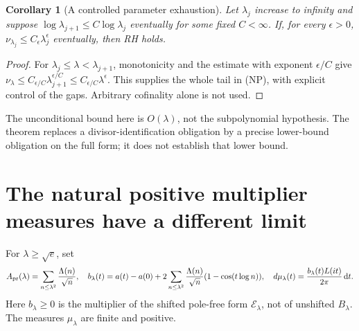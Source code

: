 \documentclass[11pt]{article}
\newtheorem{corollary}[theorem]{Corollary}
\theoremstyle{remark}\newtheorem{remark}[theorem]{Remark}
\newcommand{\dd}{\,\mathrm d}
\begin{document}
\begin{corollary}[A controlled parameter exhaustion]
\label{cor:ground-exhaustion}
Let $\lambda_j$ increase to infinity and suppose
$\log\lambda_{j+1}\le C\log\lambda_j$ eventually for some fixed
$C<\infty$. If, for every $\epsilon>0$,
$\nu_{\lambda_j}\le C_\epsilon\lambda_j^\epsilon$
eventually, then RH holds.
\end{corollary}
\begin{proof}
For $\lambda_j\le\lambda<\lambda_{j+1}$, monotonicity and the
estimate with exponent $\epsilon/C$ give
$\nu_\lambda\le C_{\epsilon/C}\lambda_{j+1}^{\epsilon/C}
\le C_{\epsilon/C}\lambda^\epsilon$.
This supplies the whole tail in (NP), with explicit control
of the gaps. Arbitrary cofinality alone is not used.
\end{proof}

The unconditional bound here is $O(\lambda)$, not the
subpolynomial hypothesis. The theorem replaces a divisor-identification
obligation by a precise lower-bound obligation on the full form;
it does not establish that lower bound.

\section{The natural positive multiplier measures have a different limit}
For $\lambda\ge\sqrt e$, set
\[
 A_{\rm pr}(\lambda)=\sum_{n\le\lambda^2}\frac{\Lambda(n)}{\sqrt n},
 \quad
 b_\lambda(t)=a(t)-a(0)+
     2\sum_{n\le\lambda^2}\frac{\Lambda(n)}{\sqrt n}
                          (1-\cos(t\log n)),
 \quad
 d\mu_\lambda(t)=\frac{b_\lambda(t)L(it)}{2\pi}\dd t .
\]
Here $b_\lambda\ge0$ is the multiplier of the shifted
pole-free form $\mathcal E_\lambda$, not of unshifted $B_\lambda$.
The measures $\mu_\lambda$ are finite and positive.
\end{document}
